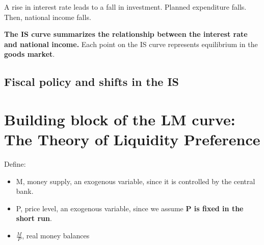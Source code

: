 \documentclass[10pt]{article}
\begin{document}
A rise in interest rate leads to a fall in investment. Planned expenditure falls.
Then, national income falls.

{\textbf {The IS curve summarizes the relationship between the interest rate and 
national income.}}
Each point on the IS curve represents equilibrium in the {\textbf {goods market}}.


\subsection{Fiscal policy and shifts in the IS}


\begin{figure}[H]
\end{figure}




\section{Building block of the LM curve: The Theory of Liquidity Preference}
Define:
\begin{itemize}
\item M, money supply, an exogenous variable, since it is controlled by the central bank.
\item P, price level, an exogenous variable, since we assume {\textbf {P is fixed in the short run}}.
\item $ \frac{M}{P} $, real money balances
\end{itemize}
\end{document}
